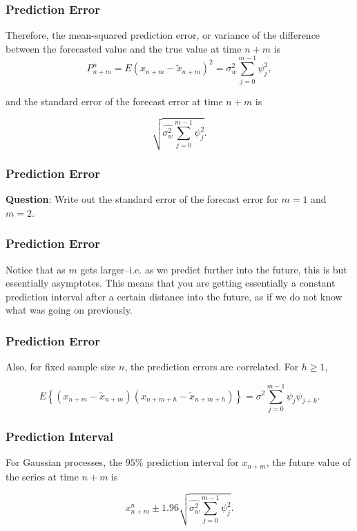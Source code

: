 \documentclass[%
xcolor=pdftex]{beamer}
\begin{document}
\begin{frame}
\frametitle{Prediction Error}

Therefore, the mean-squared prediction error, or variance of the difference between the forecasted value and the true value at time $n+m$ is
\begin{equation} \label{eq:pred_error}
P_{n+m}^n=E(x_{n+m} -\widetilde{x}_{n+m})^2=\sigma_w^2 \sum_{j=0}^{m-1} \psi^2_j,
\end{equation}

and the standard error of the forecast error at time $n+m$ is

\begin{equation} \label{eq:se_error}
\sqrt{\hat{\sigma_w^2} \sum_{j=0}^{m-1} \psi^2_j}.
\end{equation}

\end{frame}

\begin{frame}
\frametitle{Prediction Error}

\textbf{Question}: Write out the standard error of the forecast error for $m=1$ and $m=2$.

\vspace{50mm}

\end{frame}



\begin{frame}
\frametitle{Prediction Error}

Notice that as $m$ gets larger--i.e. as we predict further into
the future, this is \underline{\hspace{18 mm}} but essentially asymptotes. This
means that you are getting essentially a constant prediction
interval after a certain distance into the future, as if we do not know what was going on previously.

\end{frame}

\begin{frame}
\frametitle{Prediction Error}

Also, for fixed sample size $n$, the prediction errors are correlated. For $h \geq 1$,

$$
E\left\{(x_{n+m} -\widetilde{x}_{n+m})(x_{n+m+h} -\widetilde{x}_{n+m+h})\right\}=\sigma^2 \sum_{j=0}^{m-1} \psi_j \psi_{j+k}.
$$

\end{frame}


\begin{frame}
\frametitle{Prediction Interval}

For Gaussian processes, the $95\%$ prediction interval for $x_{n+m}$, the future value of the series at time $n+m$ is

\begin{equation}
x_{n+m}^{n} \pm 1.96 \sqrt{\hat{\sigma_w^2} \sum_{j=0}^{m-1} \psi_j^2}.
\end{equation}

\end{frame}
\end{document}
